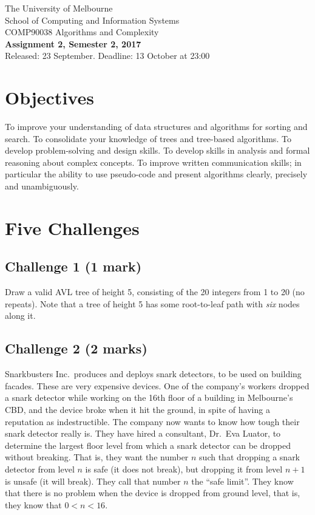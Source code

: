 \documentclass[11pt]{article}
\begin{document}
\begin{center}
{\sc The University of Melbourne
\\
School of Computing and Information Systems
\\
COMP90038 Algorithms and Complexity}
\bigskip \\
{\Large\bf Assignment 2, Semester 2, 2017}
\bigskip \\
{\large Released: 23 September.  Deadline: 13 October at 23:00}
\end{center}

\section*{Objectives}

To improve your understanding of data structures and algorithms for
sorting and search.
To consolidate your knowledge of trees and tree-based algorithms.
To develop problem-solving and design skills.
To develop skills in analysis and formal reasoning about
complex concepts.
To improve written communication skills; in particular the
ability to use pseudo-code and present algorithms clearly, 
precisely and unambiguously.

\section*{Five Challenges}

\subsection*{Challenge 1 \hfill {\small (1 mark)}}

Draw a valid AVL tree of height 5, consisting of the 20 integers
from 1 to 20 (no repeats).
Note that a tree of height 5 has some root-to-leaf path with
\emph{six} nodes along it.

\subsection*{Challenge 2 \hfill {\small (2 marks)}}

Snarkbusters Inc.\ produces and deploys snark detectors, 
to be used on building facades.
These are very expensive devices.
One of the company's workers dropped a snark detector while working on the 
16th floor of a building in Melbourne's CBD, and the device broke when it
hit the ground, in spite of having a reputation as indestructible.
The company now wants to know how tough their snark detector really is.
They have hired a consultant, Dr.\ Eva Luator, to determine the 
largest floor level from which a snark detector can be dropped
without breaking.  
That is, they want the number $n$ such that dropping a snark detector
from level $n$ is safe (it does not break), but dropping it from
level $n+1$ is unsafe (it will break).
They call that number $n$ the ``safe limit''.
They know that there is no problem when the device is dropped from ground
level, that is, they know that $0 < n < 16$.
\end{document}
